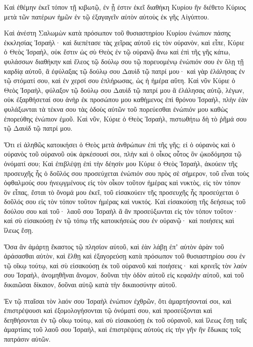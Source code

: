{Καὶ ἐθέμην ἐκεῖ τόπον τῇ κιβωτῷ, ἐν ᾗ ἐστιν ἐκεῖ διαθήκη Κυρίου ἣν διέθετο Κύριος μετὰ τῶν πατέρων ἡμῶν ἐν τῷ ἐξαγαγεῖν αὐτὸν αὐτοὺς ἐκ γῆς Αἰγύπτου.
\par }{\PP {}Καὶ ἀνέστη Σαλωμὼν κατὰ πρόσωπον τοῦ θυσιαστηρίου Κυρίου ἐνώπιον πάσης ἐκκλησίας Ἰσραήλ· καὶ διεπέτασε τὰς χεῖρας αὐτοῦ εἰς τὸν οὐρανὸν,
καὶ εἶπε, Κύριε ὁ Θεὸς Ἰσραὴλ, οὐκ ἔστιν ὡς σὺ Θεὸς ἐν τῷ οὐρανῷ ἄνω καὶ ἐπὶ τῆς γῆς κάτω, φυλάσσων διαθήκην καὶ ἔλεος τῷ δούλῳ σου τῷ πορευομένῳ ἐνώπιόν σου ἐν ὅλῃ τῇ καρδίᾳ αὐτοῦ,
ἃ ἐφύλαξας τῷ δούλῳ σου Δαυὶδ τῷ πατρί μου· καὶ γὰρ ἐλάλησας ἐν τῷ στόματί σου, καὶ ἐν χερσί σου ἐπλήρωσας, ὡς ἡ ἡμέρα αὕτη.
Καὶ νῦν Κύριε ὁ Θεὸς Ἰσραὴλ, φύλαξον τῷ δούλῳ σου Δαυὶδ τῷ πατρί μου ἃ ἐλάλησας αὐτῷ, λέγων, οὐκ ἐξαρθήσεταί σου ἀνὴρ ἐκ προσώπου μου καθήμενος ἐπὶ θρόνου Ἰσραὴλ, πλὴν ἐὰν φυλάξωνται τὰ τέκνα σου τὰς ὁδοὺς αὐτῶν τοῦ πορεύεσθαι ἐνώπιόν μου καθὼς ἐπορεύθης ἐνώπιον ἐμοῦ.
Καὶ νῦν, Κύριε ὁ Θεὸς Ἰσραὴλ, πιστωθήτω δὴ τὸ ῥῆμά σου τῷ Δαυὶδ τῷ πατρί μου.
\par }{\PP {}Ὅτι εἰ ἀληθῶς κατοικήσει ὁ Θεὸς μετὰ ἀνθρώπων ἐπὶ τῆς γῆς; εἰ ὁ οὐρανὸς καὶ ὁ οὐρανὸς τοῦ οὐρανοῦ οὐκ ἀρκέσουσί σοι, πλὴν καὶ ὁ οἶκος οὗτος ὃν ᾠκοδόμησα τῷ ὀνόματί σου;
Καὶ ἐπιβλέψῃ ἐπὶ τὴν δέησίν μου Κύριε ὁ Θεὸς Ἰσραὴλ, ἀκούειν τῆς προσευχῆς ἧς ὁ δοῦλός σου προσεύχεται ἐνώπιόν σου πρὸς σὲ σήμερον,
τοῦ εἶναι τοὺς ὀφθαλμούς σου ἠνεῳγμένους εἰς τὸν οἶκον τοῦτον ἡμέρας καὶ νυκτὸς, εἰς τὸν τόπον ὃν εἶπας, ἔσται τὸ ὄνομά μου ἐκεῖ, τοῦ εἰσακούειν τῆς προσευχῆς ἧς προσεύχεται ὁ δοῦλός σου εἰς τὸν τόπον τοῦτον ἡμέρας καὶ νυκτός.
Καὶ εἰσακούσῃ τῆς δεήσεως τοῦ δούλου σου καὶ τοῦ· λαοῦ σου Ἰσραὴλ ἃ ἂν προσεύξωνται εἰς τὸν τόπον τοῦτον· καὶ σὺ εἰσακούσῃ ἐν τῷ τόπῳ τῆς κατοικήσεώς σου ἐν οὐρανῷ· καὶ ποιήσεις καὶ ἵλεως ἔσῃ.
\par }{\PP {}Ὅσα ἂν ἁμάρτῃ ἕκαστος τῷ πλησίον αὐτοῦ, καὶ ἐὰν λάβῃ ἐπʼ αὐτὸν ἀρὰν τοῦ ἀράσασθαι αὐτὸν, καὶ ἔλθῃ καὶ ἐξαγορεύσῃ κατὰ πρόσωπον τοῦ θυσιαστηρίου σου ἐν τῷ οἴκῳ τούτῳ,
καὶ σὺ εἰσακούσῃ ἐκ τοῦ οὐρανοῦ καὶ ποιήσεις· καὶ κρινεῖς τὸν λαόν σου Ἰσραὴλ, ἀνομηθῆναι ἄνομον, δοῦναι τὴν ὁδὸν αὐτοῦ εἰς κεφαλὴν αὐτοῦ, καὶ τοῦ δικαιῶσαι δίκαιον, δοῦναι αὐτῷ κατὰ τὴν δικαιοσύνην αὐτοῦ.
\par }{\PP {}Ἐν τῷ πταῖσαι τὸν λαόν σου Ἰσραὴλ ἐνώπιον ἐχθρῶν, ὅτι ἁμαρτήσονταί σοι, καὶ ἐπιστρέψουσι καὶ ἐξομολογήσονται τῷ ὀνόματί σου, καὶ προσεύξονται καὶ δεηθήσονται ἐν τῷ οἴκῳ τούτῳ,
καὶ σὺ εἰσακούσῃ ἐκ τοῦ οὐρανοῦ, καὶ ἵλεως ἔσῃ ταῖς ἁμαρτίαις τοῦ λαοῦ σου Ἰσραὴλ, καὶ ἐπιστρέψεις αὐτοὺς εἰς τὴν γῆν ἣν ἔδωκας τοῖς πατράσιν αὐτῶν.
}
